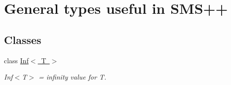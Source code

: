 \hypertarget{group___s_m_s__types}{}\section{General types useful in S\+M\+S++}
\label{group___s_m_s__types}
\subsection*{Classes}
\begin{DoxyCompactItemize}
\item 
class \mbox{\hyperlink{class_s_m_spp__di__unipi__it_1_1_inf}{Inf$<$ T $>$}}
\begin{DoxyCompactList}\small\item\em Inf$<$\+T$>$ = infinity value for T. \end{DoxyCompactList}\end{DoxyCompactItemize}
